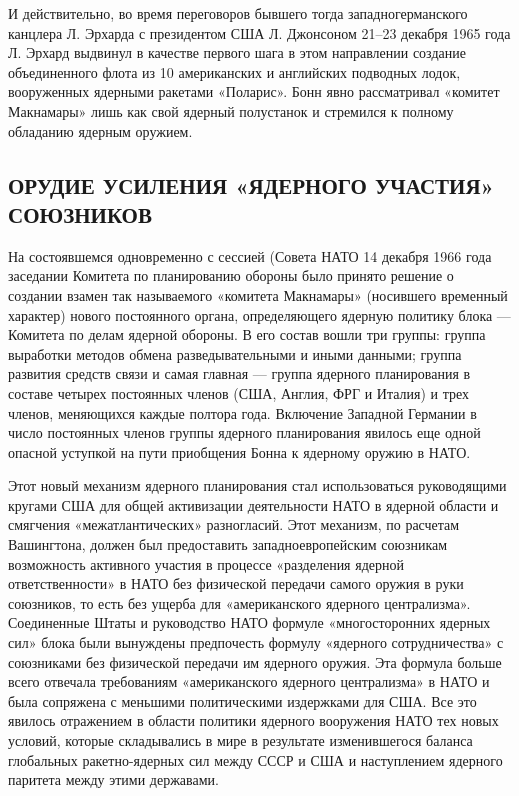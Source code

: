 \documentclass[12pt, a4paper, openany]{book}
\begin{document}
	И действительно, во время переговоров бывшего тогда западногерманского канцлера Л. Эрхарда с президентом США Л. Джонсоном 21–23 декабря 1965 года Л. Эрхард выдвинул в качестве первого шага в этом направлении создание объединенного флота из 10 американских и английских подводных лодок, вооруженных ядерными ракетами «Поларис». Бонн явно рассматривал «комитет Макнамары» лишь как свой ядерный полустанок и стремился к полному обладанию ядерным оружием.
	
	\subsection[Орудие усиления «ядерного участия» союзников]{\center ОРУДИЕ УСИЛЕНИЯ «ЯДЕРНОГО УЧАСТИЯ» СОЮЗНИКОВ}	
	
	На состоявшемся одновременно с сессией (Совета НАТО 14 декабря 1966 года заседании Комитета по планированию обороны было принято решение о создании взамен так называемого «комитета Макнамары» (носившего временный характер) нового постоянного органа, определяющего ядерную политику блока — Комитета по делам ядерной обороны. В его состав вошли три группы: группа выработки методов обмена разведывательными и иными данными; группа развития средств связи и самая главная — группа ядерного планирования в составе четырех постоянных членов (США, Англия, ФРГ и Италия) и трех членов, меняющихся каждые полтора года. Включение Западной Германии в число постоянных членов группы ядерного планирования явилось еще одной опасной уступкой на пути приобщения Бонна к ядерному оружию в НАТО.
	
	Этот новый механизм ядерного планирования стал использоваться руководящими кругами США для общей активизации деятельности НАТО в ядерной области и смягчения «межатлантических» разногласий. Этот механизм, по расчетам Вашингтона, должен был предоставить западноевропейским союзникам возможность активного участия в процессе «разделения ядерной ответственности» в НАТО без физической передачи самого оружия в руки союзников, то есть без ущерба для «американского ядерного централизма». Соединенные Штаты и руководство НАТО формуле «многосторонних ядерных сил» блока были вынуждены предпочесть формулу «ядерного сотрудничества» с союзниками без физической передачи им ядерного оружия. Эта формула больше всего отвечала требованиям «американского ядерного централизма» в НАТО и была сопряжена с меньшими политическими издержками для США. Все это явилось отражением в области политики ядерного вооружения НАТО тех новых условий, которые складывались в мире в результате изменившегося баланса глобальных ракетно-ядерных сил между СССР и США и наступлением ядерного паритета между этими державами.
	
\end{document}
